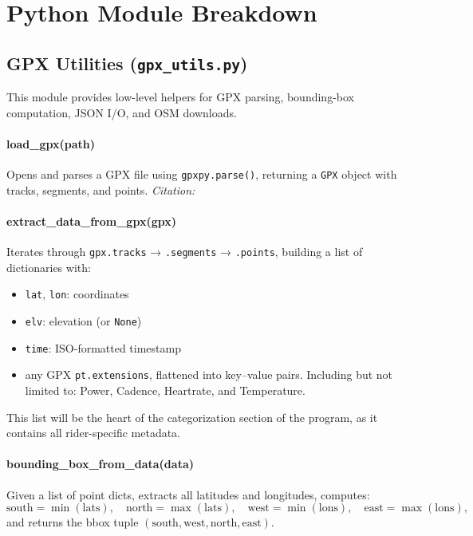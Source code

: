 \documentclass[11pt,a4paper]{article}
\begin{document}
\section{Python Module Breakdown}

\subsection{GPX Utilities (\texttt{gpx\_utils.py})}

This module provides low-level helpers for GPX parsing, bounding-box computation, JSON I/O, and OSM downloads.

\paragraph{load\_gpx(path)}
Opens and parses a GPX file using \texttt{gpxpy.parse()}, returning a \texttt{GPX} object with tracks, segments, and points. \emph{Citation:} \citep{gpxpy}

\paragraph{extract\_data\_from\_gpx(gpx)}
Iterates through \texttt{gpx.tracks} → \texttt{.segments} → \texttt{.points}, building a list of dictionaries with:
\begin{itemize}
	\item \texttt{lat}, \texttt{lon}: coordinates
	\item \texttt{elv}: elevation (or \texttt{None})
	\item \texttt{time}: ISO-formatted timestamp
	\item any GPX \texttt{pt.extensions}, flattened into key–value pairs. Including but not limited to: Power, Cadence, Heartrate, and Temperature.
\end{itemize}
This list will be the heart of the categorization section of the program, as it contains all rider-specific metadata.

\paragraph{bounding\_box\_from\_data(data)}
Given a list of point dicts, extracts all latitudes and longitudes, computes:
\[
	\text{south} = \min(\mathrm{lats}), \quad
	\text{north} = \max(\mathrm{lats}),\quad
	\text{west}  = \min(\mathrm{lons}),\quad
	\text{east}  = \max(\mathrm{lons}),
\]
and returns the bbox tuple
\((\text{south},\text{west},\text{north},\text{east})\).
\end{document}
